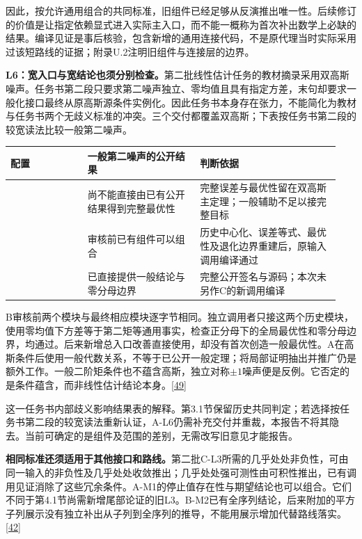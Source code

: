 因此，按允许通用组合的共同标准，旧组件已经足够从反演推出唯一性。后续修订的价值是让指定依赖显式进入实际主入口，而不能一概称为首次补出数学上必缺的结果。编译见证是事后核验，包含新增的通用连接代码，不是原代理当时实际采用过该短路线的证据；附录U.2注明旧组件与连接层的边界。

\textbf{L6：宽入口与宽结论也须分别检查。}第二批线性估计任务的教材摘录采用双高斯噪声。任务书第二段只要求第二噪声独立、零均值且具有指定方差，末句却要求一般化接口最终从原高斯源条件实例化。因此任务书本身存在张力，不能简化为教材与任务书两个无歧义标准的冲突。三个交付都覆盖双高斯；下表按任务书第二段的较宽读法比较一般第二噪声。

\begingroup\small\setlength{\tabcolsep}{3pt}\renewcommand{\arraystretch}{1.14}
\par\nopagebreak\medskip\noindent\begin{minipage}[t]{\linewidth}
\begin{tabular}{>{\raggedright\arraybackslash}p{0.22\linewidth}>{\raggedright\arraybackslash}p{0.32\linewidth}>{\raggedright\arraybackslash}p{0.4\linewidth}}
\toprule
\textbf{配置} & \textbf{一般第二噪声的公开结果} & \textbf{判断依据}\\\midrule

{A} & {尚不能直接由已有公开结果得到完整最优性} & {完整误差与最优性留在双高斯主定理；一般辅助不足以接完整目标}\\
{B} & {审核前已有组件可以组合} & {历史中心化、误差等式、最优性及退化边界重建后，原输入调用编译通过}\\
{C} & {已直接提供一般结论与零分母边界} & {完整公开签名与源码；本次未另作C的新调用编译}\\
\bottomrule\end{tabular}\end{minipage}\par\medskip\endgroup
B审核前两个模块与最终相应模块逐字节相同。独立调用者只接这两个历史模块，使用零均值下方差等于第二矩等通用事实，检查正分母下的全局最优性和零分母边界，均通过。后来新增总入口改善直接使用，却没有首次创造一般最优性。A在高斯条件后使用一般代数关系，不等于已公开一般定理；将局部证明抽出并推广仍是额外工作。一般二阶矩条件也不蕴含高斯，独立对称$\pm1$噪声便是反例。它否定的是条件蕴含，而非线性估计结论本身。\hyperlink{ref-49}{\mbox{[49]}}

这一任务书内部歧义影响结果表的解释。第3.1节保留历史共同判定；若选择按任务书第二段的较宽读法重新认证，A-L6仍需补充交付并重裁，本报告不将其隐去。当前可确定的是组件及范围的差别，无需改写旧意见才能报告。

\textbf{相同标准还须适用于其他接口和路线。}第二批C-L3所需的几乎处处非负性，可由同一输入的非负性及几乎处处收敛推出；几乎处处强可测性由可积性推出，已有调用见证消除了这些冗余条件。A-M1的停止值存在性与期望结论也可以组合。它们不同于第4.1节尚需新增尾部论证的旧L3。B-M2已有全序列结论，后来附加的平方子列展示没有独立补出从子列到全序列的推导，不能用展示增加代替路线落实。\hyperlink{ref-42}{\mbox{[42]}}

